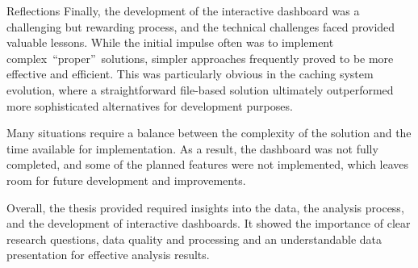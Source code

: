 \begin{section}{Reflections}
	Finally, the development of the interactive dashboard was a challenging but rewarding process, and the technical challenges faced provided valuable lessons.
	While the initial impulse often was to implement complex~\enquote{proper}~solutions, simpler approaches frequently proved to be more effective and efficient.
	This was particularly obvious in the caching system evolution, where a straightforward file-based solution ultimately outperformed more sophisticated alternatives for development purposes.

	Many situations require a balance between the complexity of the solution and the time available for implementation.
	As a result, the dashboard was not fully completed, and some of the planned features were not implemented, which leaves room for future development and improvements.

	Overall, the thesis provided required insights into the data, the analysis process, and the development of interactive dashboards.
	It showed the importance of clear research questions, data quality and processing and an understandable data presentation for effective analysis results.
\end{section}

